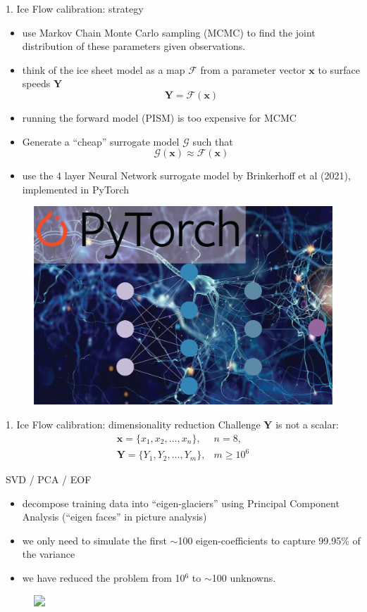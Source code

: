 \documentclass[hide notes,intlimits]{beamer}
\begin{document}
\begin{frame}{1. Ice Flow calibration: strategy}
\begin{itemize}
\item use Markov Chain Monte Carlo sampling (MCMC) to find the joint distribution of these parameters given observations.
\item think of the ice sheet model as a map $\mathcal{F}$ from a parameter vector $\mathbf{x}$ to surface speeds $\mathbf{Y}$
\begin{equation*}
\mathbf{Y} = \mathcal{F}(\mathbf{x})
\end{equation*}
\item running the forward model (PISM) is too expensive for MCMC
\item Generate a ``cheap'' surrogate model $\mathcal{G}$ such that
\begin{equation*}
\mathcal{G}(\mathbf{x}) \approx \mathcal{F}(\mathbf{x})
\end{equation*}
\item use the 4 layer Neural Network surrogate model by Brinkerhoff et al (2021), implemented in PyTorch
\end{itemize}
  \begin{figure}
    \includegraphics[width=.35\textwidth]{neural-network}
  \end{figure}
\end{frame}



\begin{frame}{1. Ice Flow calibration: dimensionality reduction}
  \alert{Challenge $\mathbf{Y}$ is not a scalar}:
\begin{eqnarray*}
\mathbf{x} = \{x_1, x_2,\ldots,x_n\}, & n = 8, \\ 
\mathbf{Y} = \{Y_1, Y_2, \ldots,Y_m \},& m \ge 10^6
\end{eqnarray*}
\vspace{-1.5em}
\begin{block}{SVD / PCA / EOF}
\begin{itemize}
\item decompose training data into ``eigen-glaciers'' using Principal Component Analysis (``eigen faces'' in picture analysis)
\item we only need to simulate the first $\sim$100 eigen-coefficients to capture 99.95\% of the variance
\item we have reduced the problem from 10$^6$ to $\sim$100 unknowns.
\end{itemize}
\vspace{-0.5em}
\end{block}
\begin{figure}
  \includegraphics<1->[height=6cm]{eigenglaciers_0}
\end{figure}
\end{frame}
\end{document}
